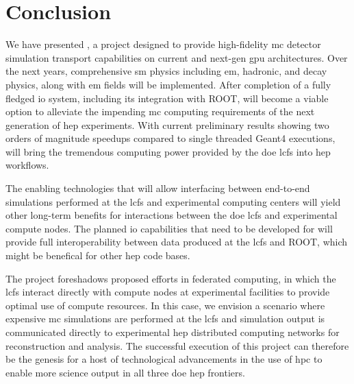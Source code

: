 \section{Conclusion}

We have presented \celeritas, a project designed to provide high-fidelity
\ac{mc} detector simulation transport capabilities on current and next-gen
\ac{gpu} architectures. Over the next years, comprehensive \ac{sm} physics
including \ac{em}, hadronic, and decay physics, along with \ac{em} fields will
be implemented. After completion of a fully fledged \ac{io} system, including
its integration with ROOT, \celeritas will become a viable option to alleviate
the impending \ac{mc} computing requirements of the next generation of \ac{hep}
experiments. With current preliminary results showing two orders of magnitude
speedups compared to single threaded Geant4 executions, \celeritas will bring
the tremendous computing power provided by the \ac{doe} \acp{lcf} into \ac{hep}
workflows.

The enabling technologies that will allow interfacing between end-to-end
simulations performed at the \acp{lcf} and experimental computing centers will
yield other long-term benefits for interactions between the \ac{doe} \acp{lcf}
and experimental compute nodes. The planned \ac{io} capabilities that need to be
developed for \celeritas will provide full interoperability between data
produced at the \acp{lcf} and ROOT, which might be benefical for other \ac{hep}
code bases.

The \celeritas project foreshadows proposed efforts in federated computing, in
which the \acp{lcf} interact directly with compute nodes at experimental
facilities to provide optimal use of compute resources.  In this case, we
envision a scenario where expensive \ac{mc} simulations are performed at the
\acp{lcf} and simulation output is communicated directly to experimental
\ac{hep} distributed computing networks for reconstruction and analysis.  The
successful execution of this project can therefore be the genesis for a host of
technological advancements in the use of \ac{hpc} to enable more science output
in all three \ac{doe} \ac{hep} frontiers.